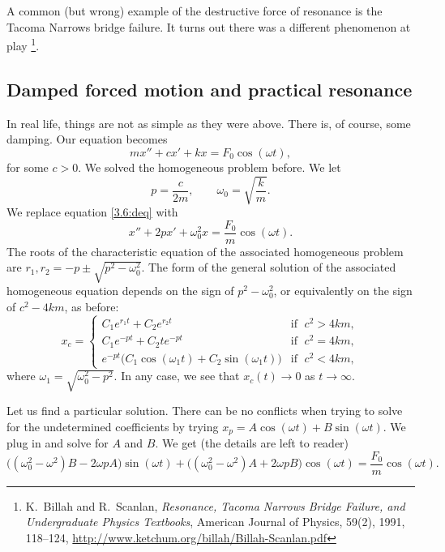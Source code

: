 A common (but wrong) example of the destructive force of resonance is the Tacoma
Narrows bridge failure.  It turns out there was a different
phenomenon at play%
\footnote{K.\ Billah and R.\ Scanlan, \emph{Resonance, Tacoma Narrows
Bridge Failure, and Undergraduate Physics Textbooks}, American Journal of
Physics, 59(2), 1991, 118--124,
\url{http://www.ketchum.org/billah/Billah-Scanlan.pdf}}.

\subsection{Damped forced motion and practical resonance}

In real life, things are not as simple as they were above.  There is,
of course, some damping.  Our equation becomes
\begin{equation} \label{3.6:deq}
mx'' + cx' + kx = F_0 \cos (\omega t) ,
\end{equation}
for some $c > 0$.  We solved the homogeneous problem before.  We let
\begin{equation*}
p = \frac{c}{2m},  \qquad \omega_0 = \sqrt{\frac{k}{m}} .
\end{equation*}
We replace equation \eqref{3.6:deq} with
\begin{equation*}
x'' + 2px' + \omega_0^2x = \frac{F_0}{m} \cos (\omega t) .
\end{equation*}
The roots of the characteristic equation of the associated
homogeneous problem are $r_1,r_2 = -p \pm \sqrt{p^2 - \omega_0^2}$.  The form
of the general solution of the associated homogeneous equation
depends on the sign of $p^2 - \omega_0^2$, or
equivalently on the sign of $c^2 - 4km$, as before:
\begin{equation*}
x_c =
\begin{cases}
C_1 e^{r_1 t} + C_2 e^{r_2 t} & \text{if } \; c^2 > 4km , \\
C_1 e^{-p t} + C_2 t e^{-p t} & \text{if } \; c^2 = 4km , \\
e^{-p t} \bigl( C_1 \cos (\omega_1 t) + C_2 \sin (\omega_1 t) \bigr) &
  \text{if } \; c^2 < 4km ,
\end{cases}
\end{equation*}
where $\omega_1 = \sqrt{\omega_0^2 - p^2}$.  In any case, we see that
$x_c(t) \to 0$ as $t \to \infty$.

\pagebreak[2]
Let us find a particular solution.
There can be no conflicts when trying to solve for the
undetermined coefficients by trying $x_p = A \cos (\omega t)
+ B \sin (\omega t)$.
We plug in and solve for $A$ and $B$.
We get (the  %
details are left to reader)
\begin{equation*}
\bigl((\omega_0^2  - \omega^2)B - 2\omega p A\bigr) \sin (\omega t)
+
\bigl((\omega_0^2  - \omega^2)A + 2\omega p B\bigr) \cos (\omega t)
=
\frac{F_0}{m} \cos (\omega t) .
\end{equation*}

